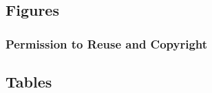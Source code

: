 \documentclass[utf8]{frontiersSCNS} %
\begin{document}
\subsection{Figures}


\subsubsection{Permission to Reuse and Copyright}

\subsection{Tables}
\end{document}
